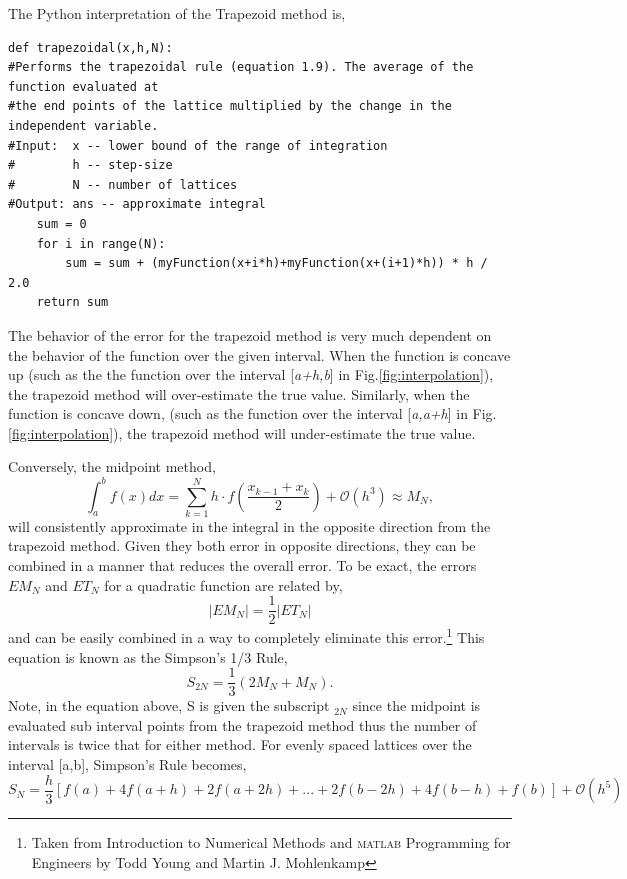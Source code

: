 \documentclass[10pt]{article}
\begin{document}
The Python interpretation of the Trapezoid method is,
\begin{lstlisting}
def trapezoidal(x,h,N):
#Performs the trapezoidal rule (equation 1.9). The average of the function evaluated at
#the end points of the lattice multiplied by the change in the independent variable.
#Input:  x -- lower bound of the range of integration
#        h -- step-size
#        N -- number of lattices
#Output: ans -- approximate integral    
    sum = 0
    for i in range(N):
        sum = sum + (myFunction(x+i*h)+myFunction(x+(i+1)*h)) * h / 2.0
    return sum 
\end{lstlisting}

The behavior of the error for the trapezoid method is very much dependent on the behavior of the function over the given interval. When the function is concave up (such as the the function over the interval [\textit{a+h,b}] in Fig.\ref{fig:interpolation}), the trapezoid method will over-estimate the true value. Similarly, when the function is concave down, (such as the function over the interval [\textit{a,a+h}] in Fig.\ref{fig:interpolation}), the trapezoid method will under-estimate the true value. 

Conversely, the midpoint method,
\begin{equation}
	\int^b_a f(x)dx = \sum^N_{k=1} h\cdot f\left(\frac{x_{k-1}+x_k}{2}\right) + \mathcal{O}(h^3) \approx M_N,
	\label{eq:midpoint}
\end{equation}
will consistently approximate in the integral in the opposite direction from the trapezoid method. Given they both error in opposite directions, they can be combined in a manner that reduces the overall error. To be exact, the errors $EM_N$ and $ET_N$ for a quadratic function are related by,
\[
	|EM_N| = \frac{1}{2}|ET_N|
\]
and can be easily combined in a way to completely eliminate this error.\footnote{Taken from Introduction to Numerical Methods and \textsc{matlab} Programming for Engineers by Todd Young and Martin J. Mohlenkamp} This equation is known as the Simpson's 1/3 Rule, 
\[
	S_{2N} = \frac{1}{3}(2M_N + M_N).
\]
Note, in the equation above, S is given the subscript $_{2N}$ since the midpoint is evaluated sub interval points from the trapezoid method thus the number of intervals is twice that for either method. For evenly spaced lattices over the interval [a,b], Simpson's Rule becomes,
\begin{equation}
	S_N = \frac{h}{3}[f(a)+4f(a+h)+2f(a+2h)+...+2f(b-2h)+4f(b-h)+f(b)] + \mathcal{O}(h^5)
	\label{eq:simpson}
\end{equation}
\end{document}
